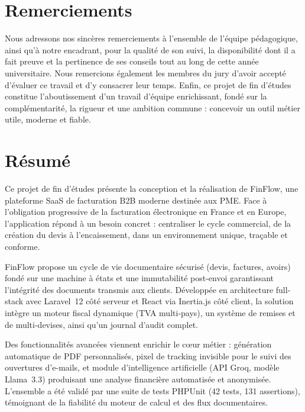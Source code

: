 \documentclass[12pt,a4paper]{report}
\begin{document}
\chapter*{Remerciements}

Nous adressons nos sincères remerciements à l'ensemble de l'équipe pédagogique, ainsi qu'à notre encadrant, pour la qualité de son suivi, la disponibilité dont il a fait preuve et la pertinence de ses conseils tout au long de cette année universitaire. Nous remercions également les membres du jury d'avoir accepté d'évaluer ce travail et d'y consacrer leur temps. Enfin, ce projet de fin d'études constitue l'aboutissement d'un travail d'équipe enrichissant, fondé sur la complémentarité, la rigueur et une ambition commune : concevoir un outil métier utile, moderne et fiable.

\chapter*{Résumé}

Ce projet de fin d'études présente la conception et la réalisation de FinFlow, une plateforme SaaS de facturation B2B moderne destinée aux PME. Face à l'obligation progressive de la facturation électronique en France et en Europe, l'application répond à un besoin concret : centraliser le cycle commercial, de la création du devis à l'encaissement, dans un environnement unique, traçable et conforme.

FinFlow propose un cycle de vie documentaire sécurisé (devis, factures, avoirs) fondé sur une machine à états et une immutabilité post-envoi garantissant l'intégrité des documents transmis aux clients. Développée en architecture full-stack avec Laravel~12 côté serveur et React via Inertia.js côté client, la solution intègre un moteur fiscal dynamique (TVA multi-pays), un système de remises et de multi-devises, ainsi qu'un journal d'audit complet.

Des fonctionnalités avancées viennent enrichir le cœur métier : génération automatique de PDF personnalisés, pixel de tracking invisible pour le suivi des ouvertures d'e-mails, et module d'intelligence artificielle (API Groq, modèle Llama~3.3) produisant une analyse financière automatisée et anonymisée. L'ensemble a été validé par une suite de tests PHPUnit (42 tests, 131 assertions), témoignant de la fiabilité du moteur de calcul et des flux documentaires.
\end{document}
